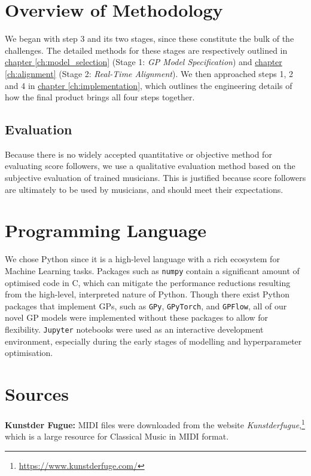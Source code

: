 \section{Overview of Methodology}
We began with step 3 and its two stages, since these constitute the bulk of the challenges. The detailed methods for these stages are respectively outlined in \hyperref[ch:model_selection]{chapter \ref*{ch:model_selection}} (Stage 1: \textit{GP Model Specification}) and \hyperref[ch:alignment]{chapter \ref*{ch:alignment}} (Stage 2: \textit{Real-Time Alignment}). We then approached steps 1, 2 and 4 in \hyperref[ch:implementation]{chapter \ref*{ch:implementation}}, which outlines the engineering details of how the final product brings all four steps together. 


\subsection{Evaluation}
Because there is no widely accepted quantitative or objective method for evaluating score followers, we use a qualitative evaluation method based on the subjective evaluation of trained musicians. This is justified because score followers are ultimately to be used by musicians, and should meet their expectations.   %



\section{Programming Language}
We chose Python since it is a high-level language with a rich ecosystem for Machine Learning tasks. Packages such as \verb|numpy| contain a significant amount of optimised code in C, which can mitigate the performance reductions resulting from the high-level, interpreted nature of Python. Though there exist Python packages that implement GPs, such as \verb|GPy|, \verb|GPyTorch|, and \verb|GPFlow|, all of our novel GP models were implemented without these packages to allow for flexibility. \verb|Jupyter| notebooks were used as an interactive development environment, especially during the early stages of modelling and hyperparameter optimisation. 




\section{Sources}
\textbf{Kunstder Fugue:} MIDI files were downloaded from the website \textit{Kunstderfugue},\footnote{\href{https://www.kunstderfuge.com/}{https://www.kunstderfuge.com/}} which is a large resource for Classical Music in MIDI format. 

